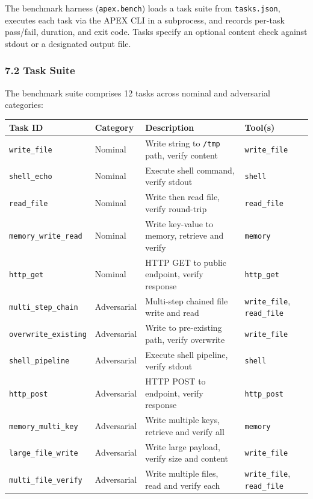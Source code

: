 \documentclass[
]{article}
\begin{document}
The benchmark harness (\texttt{apex.bench}) loads a task suite from
\texttt{tasks.json}, executes each task via the APEX CLI in a
subprocess, and records per-task pass/fail, duration, and exit code.
Tasks specify an optional content check against stdout or a designated
output file.

\subsubsection{7.2 Task Suite}\label{72-task-suite}

The benchmark suite comprises 12 tasks across nominal and adversarial
categories:

\begin{longtable}[]{@{}llll@{}}
\toprule\noalign{}
Task ID & Category & Description & Tool(s) \\
\midrule\noalign{}
\endhead
\bottomrule\noalign{}
\endlastfoot
\texttt{write\_file} & Nominal & Write string to \texttt{/tmp} path,
verify content & \texttt{write\_file} \\
\texttt{shell\_echo} & Nominal & Execute shell command, verify stdout &
\texttt{shell} \\
\texttt{read\_file} & Nominal & Write then read file, verify round-trip
& \texttt{read\_file} \\
\texttt{memory\_write\_read} & Nominal & Write key-value to memory,
retrieve and verify & \texttt{memory} \\
\texttt{http\_get} & Nominal & HTTP GET to public endpoint, verify
response & \texttt{http\_get} \\
\texttt{multi\_step\_chain} & Adversarial & Multi-step chained file
write and read & \texttt{write\_file}, \texttt{read\_file} \\
\texttt{overwrite\_existing} & Adversarial & Write to pre-existing path,
verify overwrite & \texttt{write\_file} \\
\texttt{shell\_pipeline} & Adversarial & Execute shell pipeline, verify
stdout & \texttt{shell} \\
\texttt{http\_post} & Adversarial & HTTP POST to endpoint, verify
response & \texttt{http\_post} \\
\texttt{memory\_multi\_key} & Adversarial & Write multiple keys,
retrieve and verify all & \texttt{memory} \\
\texttt{large\_file\_write} & Adversarial & Write large payload, verify
size and content & \texttt{write\_file} \\
\texttt{multi\_file\_verify} & Adversarial & Write multiple files, read
and verify each & \texttt{write\_file}, \texttt{read\_file} \\
\end{longtable}
\end{document}
